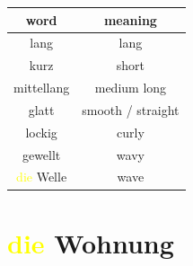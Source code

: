 \begin{center}
    \begin{tabular}{|c|c|}
        \hline
        \rowcolor{gray}
        word                          & meaning           \\
        \hline
        lang                          & lang              \\
        kurz                          & short             \\
        mittellang                    & medium long       \\
        \hline
        glatt                         & smooth / straight \\
        lockig                        & curly             \\
        gewellt                       & wavy              \\
        \textcolor{yellow}{die} Welle & wave              \\
        \hline
    \end{tabular}
\end{center}

\section{\textcolor{yellow}{die} Wohnung}


